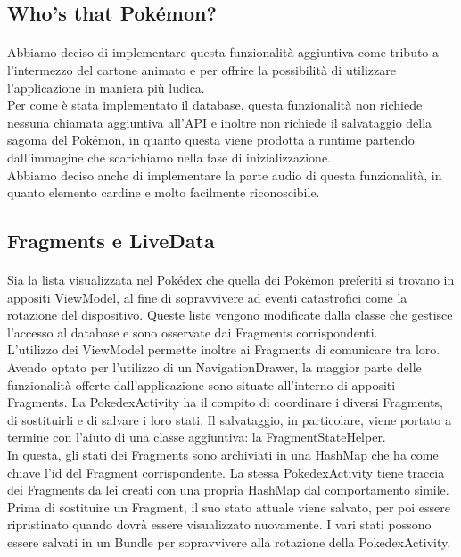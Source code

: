 \documentclass[a4paper,11pt]{article}
\begin{document}
				\subsection{Who's that Pokémon?}
					\paragraph{}
						Abbiamo deciso di implementare questa funzionalità aggiuntiva come tributo a l’intermezzo del cartone animato e per offrire la possibilità di utilizzare l’applicazione in maniera più ludica.\\
						Per come è stata implementato il database, questa funzionalità non richiede nessuna chiamata aggiuntiva all’API e inoltre non richiede il salvataggio della sagoma del Pokémon, in quanto questa viene prodotta a runtime partendo dall’immagine che scarichiamo nella fase di inizializzazione.\\
						Abbiamo deciso anche di implementare la parte audio di questa funzionalità, in quanto elemento cardine e molto facilmente riconoscibile.\\
				\subsection{Fragments e LiveData}
					\paragraph{}
						Sia la lista visualizzata nel Pokédex che quella dei Pokémon preferiti si trovano in appositi ViewModel, al fine di sopravvivere ad eventi catastrofici come la rotazione del dispositivo. Queste liste vengono modificate dalla classe che gestisce l’accesso al database e sono osservate dai Fragments corrispondenti.\\
						L’utilizzo dei ViewModel permette inoltre ai Fragments di comunicare tra loro.\\
						Avendo optato per l’utilizzo di un NavigationDrawer, la maggior parte delle funzionalità offerte dall’applicazione sono situate all’interno di appositi Fragments. La PokedexActivity ha il compito di coordinare i diversi Fragments, di sostituirli e di salvare i loro stati. Il salvataggio, in particolare, viene portato a termine con l’aiuto di una classe aggiuntiva: la FragmentStateHelper.\\
						In questa, gli stati dei Fragments sono archiviati in una HashMap che ha come chiave l’id del Fragment corrispondente. La stessa PokedexActivity tiene traccia dei Fragments da lei creati con una propria HashMap dal comportamento simile. Prima di sostituire un Fragment, il suo stato attuale viene salvato, per poi essere ripristinato quando dovrà essere visualizzato nuovamente. I vari stati possono essere salvati in un Bundle per sopravvivere alla rotazione della PokedexActivity.\\
				\newpage

				
  						
\end{document}
